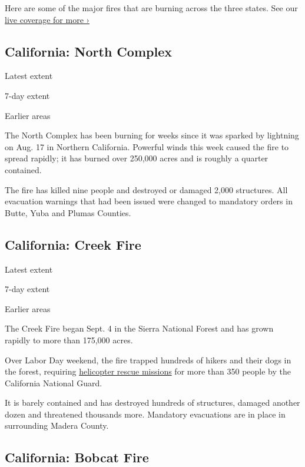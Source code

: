 Here are some of the major fires that are burning across the three
states. See our
\href{https://www.nytimes3xbfgragh.onion/2020/09/12/us/wildfires-live-updates.html}{live
coverage for more ›}

\hypertarget{california-north-complex}{%
\subsection{California: North Complex}\label{california-north-complex}}

Latest extent

7-day extent

Earlier areas

The North Complex has been burning for weeks since it was sparked by
lightning on Aug. 17 in Northern California. Powerful winds this week
caused the fire to spread rapidly; it has burned over 250,000 acres and
is roughly a quarter contained.

The fire has killed nine people and destroyed or damaged 2,000
structures. All evacuation warnings that had been issued were changed to
mandatory orders in Butte, Yuba and Plumas Counties.

\hypertarget{california-creek-fire}{%
\subsection{California: Creek Fire}\label{california-creek-fire}}

Latest extent

7-day extent

Earlier areas

The Creek Fire began Sept. 4 in the Sierra National Forest and has grown
rapidly to more than 175,000 acres.

Over Labor Day weekend, the fire trapped hundreds of hikers and their
dogs in the forest, requiring
\href{https://www.nytimes3xbfgragh.onion/2020/09/08/us/california-wildfires-helicopter-rescue.html}{helicopter
rescue missions} for more than 350 people by the California National
Guard.

It is barely contained and has destroyed hundreds of structures, damaged
another dozen and threatened thousands more. Mandatory evacuations are
in place in surrounding Madera County.

\hypertarget{california-bobcat-fire}{%
\subsection{California: Bobcat Fire}\label{california-bobcat-fire}}

